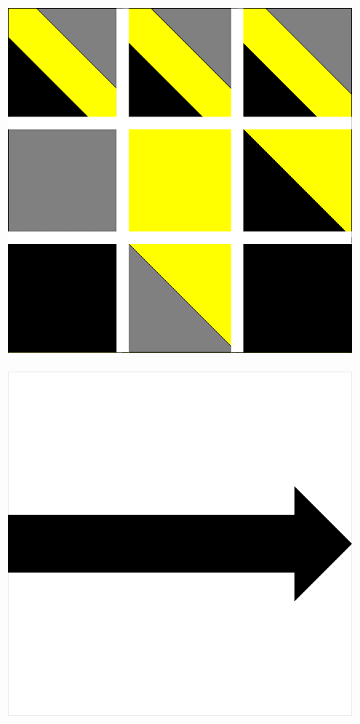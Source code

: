 \documentclass[a4paper]{article}
\begin{document}
\begin{figure}[!ht]
    \centering
    \begin{subfigure}[t]{0.17\textwidth}
        \includegraphics[width=\textwidth]{img/rule50.png}
    \end{subfigure}
    \hfill
    \begin{subfigure}[t]{0.17\textwidth} 
        \includegraphics[width=\textwidth]{img/fleche3.png} 

\end{subfigure}
\end{figure}
\end{document}
